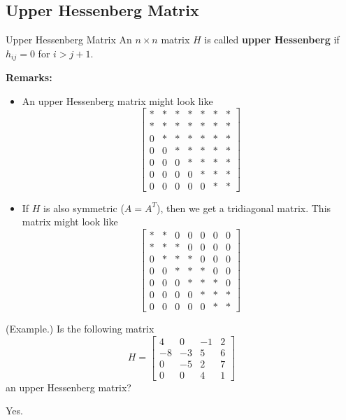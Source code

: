 \documentclass[letterpaper]{article}
\newcommand{\0}{\mathbf{0}}
\begin{document}
\subsection{Upper Hessenberg Matrix}
\begin{definition}{Upper Hessenberg Matrix}{}
    An $n \times n$ matrix $H$ is called \textbf{upper Hessenberg} if $h_{ij} = 0$ for $i > j + 1$. 
\end{definition}
\textbf{Remarks:} 
\begin{itemize}
    \item An upper Hessenberg matrix might look like 
    \[\begin{bmatrix}
        * & * & * & * & * & * & * \\ 
        * & * & * & * & * & * & * \\
        0 & * & * & * & * & * & * \\
        0 & 0 & * & * & * & * & * \\ 
        0 & 0 & 0 & * & * & * & * \\ 
        0 & 0 & 0 & 0 & * & * & * \\ 
        0 & 0 & 0 & 0 & 0 & * & *
    \end{bmatrix}\]
    \item If $H$ is also symmetric ($A = A^T$), then we get a tridiagonal matrix. This matrix might look like 
    \[\begin{bmatrix}
        * & * & 0 & 0 & 0 & 0 & 0 \\ 
        * & * & * & 0 & 0 & 0 & 0 \\
        0 & * & * & * & 0 & 0 & 0 \\
        0 & 0 & * & * & * & 0 & 0 \\ 
        0 & 0 & 0 & * & * & * & 0 \\ 
        0 & 0 & 0 & 0 & * & * & * \\ 
        0 & 0 & 0 & 0 & 0 & * & *
    \end{bmatrix}\]
\end{itemize}

\begin{mdframed}
    (Example.) Is the following matrix 
    \[H = \begin{bmatrix}
        4 & 0 & -1 & 2 \\ 
        -8 & -3 & 5 & 6 \\ 
        0 & -5 & 2 & 7 \\ 
        0 & 0 & 4 & 1
    \end{bmatrix}\]
    an upper Hessenberg matrix? 

    \begin{mdframed}
        Yes. 
    \end{mdframed}
\end{mdframed}
\end{document}
